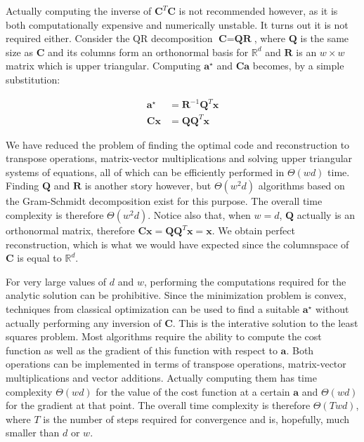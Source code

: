 \documentclass[12pt,a4paper,oneside,english]{UPBThesis}
\newcommand{\hctimes}[2]{{#1}\!\times\!{#2}}
\newcommand{\hcsignalspace}{\mathbb{R}^d}
\begin{document}
Actually computing the inverse of $\textbf{C}^T\textbf{C}$ is not recommended however, as it is both computationally expensive and numerically unstable. It turns out it is not required either. Consider the QR decomposition $\textbf{C} = \textbf{Q}\textbf{R}$, where $\textbf{Q}$ is the same size as $\textbf{C}$ and its columns form an orthonormal basis for $\hcsignalspace$ and $\textbf{R}$ is an $\hctimes{w}{w}$ matrix which is upper triangular. Computing $\textbf{a}^\star$ and $\textbf{C}\textbf{a}$ becomes, by a simple substitution:

\begin{align*}
\textbf{a}^\star & = \textbf{R}^{-1}\textbf{Q}^T\textbf{x} \\
\textbf{C}\textbf{x} & = \textbf{Q}\textbf{Q}^T\textbf{x}
\end{align*}

We have reduced the problem of finding the optimal code and reconstruction to transpose operations, matrix-vector multiplications and solving upper triangular systems of equations, all of which can be efficiently performed in $\Theta(wd)$ time. Finding $\textbf{Q}$ and $\textbf{R}$ is another story however, but $\Theta(w^2d)$ algorithms based on the Gram-Schmidt decomposition exist for this purpose. The overall time complexity is therefore $\Theta(w^2d)$. Notice also that, when $w = d$, $\textbf{Q}$ actually is an orthonormal matrix, therefore $\textbf{C}\textbf{x} = \textbf{Q}\textbf{Q}^T\textbf{x} = \textbf{x}$. We obtain perfect reconstruction, which is what we would have expected since the columnspace of $\textbf{C}$ is equal to $\hcsignalspace$.

For very large values of $d$ and $w$, performing the computations required for the analytic solution can be prohibitive. Since the minimization problem is convex, techniques from classical optimization can be used to find a suitable $\textbf{a}^\star$ without actually performing any inversion of $\textbf{C}$. This is the interative solution to the least squares problem. Most algorithms require the ability to compute the cost function as well as the gradient of this function with respect to $\textbf{a}$. Both operations can be implemented in terms of transpose operations, matrix-vector multiplications and vector additions. Actually computing them has time complexity $\Theta(wd)$ for the value of the cost function at a certain $\textbf{a}$ and $\Theta(wd)$ for the gradient at that point. The overall time complexity is therefore $\Theta(Twd)$, where $T$ is the number of steps required for convergence and is, hopefully, much smaller than $d$ or $w$.
\end{document}
